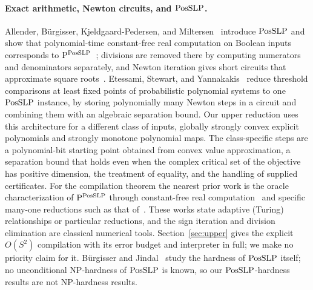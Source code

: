 \paragraph{Exact arithmetic, Newton circuits, and $\mathrm{PosSLP}$.}
Allender, B\"urgisser, Kjeldgaard-Pedersen, and
Miltersen~\cite{AllenderEtAl2009} introduce $\mathrm{PosSLP}$ and show that
polynomial-time constant-free real computation on Boolean inputs corresponds
to $\mathrm P^{\mathrm{PosSLP}}$~\cite[Proposition~1.1]{AllenderEtAl2009}; divisions
are removed there by computing numerators and denominators separately, and
Newton iteration gives short circuits that approximate square
roots~\cite[Section~1.4]{AllenderEtAl2009}. Etessami, Stewart, and
Yannakakis~\cite[Appendix~C]{EtessamiStewartYannakakis2012} reduce threshold
comparisons at least fixed points of probabilistic polynomial systems to one
$\mathrm{PosSLP}$ instance, by storing polynomially many Newton steps in a circuit
and combining them with an algebraic separation bound. Our upper reduction
uses this architecture for a different class of inputs, globally strongly
convex explicit polynomials and strongly monotone polynomial maps. The
class-specific steps are a polynomial-bit starting point obtained from
convex value approximation, a separation bound that holds even when the
complex critical set of the objective has positive dimension, the treatment
of equality, and the handling of supplied certificates. For the compilation
theorem the nearest prior work is the oracle characterization of
$\mathrm P^{\mathrm{PosSLP}}$ through constant-free real
computation~\cite{AllenderEtAl2009,BuergisserJindal2024} and specific
many-one reductions such as that of~\cite{EtessamiStewartYannakakis2012}.
These works state adaptive (Turing) relationships or particular reductions,
and the sign iteration and division elimination are classical numerical
tools. Section~\ref{sec:upper} gives the explicit $O(S^2)$ compilation with
its error budget and interpreter in full; we make no priority claim for it.
B\"urgisser and Jindal~\cite{BuergisserJindal2024} study the hardness of
$\mathrm{PosSLP}$ itself; no unconditional NP-hardness of $\mathrm{PosSLP}$ is known, so our
$\mathrm{PosSLP}$-hardness results are not NP-hardness results.

